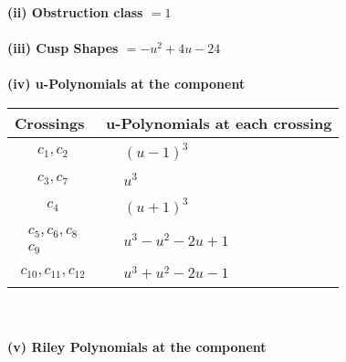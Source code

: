 \documentclass[1p]{elsarticle_modified}
\theoremstyle{definition}
\begin{document}
\flushleft \textbf{(ii) Obstruction class $= 1$}\\~\\
\flushleft \textbf{(iii) Cusp Shapes $= - u^2+4 u-24$}\\~\\
\newpage\renewcommand{\arraystretch}{1}
\flushleft \textbf{(iv) u-Polynomials at the component}\newline \\
\begin{tabular}{m{50pt}|m{274pt}}
Crossings & \hspace{64pt}u-Polynomials at each crossing \\
\hline $$\begin{aligned}c_{1},c_{2}\end{aligned}$$&$\begin{aligned}
&(u-1)^3
\end{aligned}$\\
\hline $$\begin{aligned}c_{3},c_{7}\end{aligned}$$&$\begin{aligned}
&u^3
\end{aligned}$\\
\hline $$\begin{aligned}c_{4}\end{aligned}$$&$\begin{aligned}
&(u+1)^3
\end{aligned}$\\
\hline $$\begin{aligned}c_{5},c_{6},c_{8}\\c_{9}\end{aligned}$$&$\begin{aligned}
&u^3- u^2-2 u+1
\end{aligned}$\\
\hline $$\begin{aligned}c_{10},c_{11},c_{12}\end{aligned}$$&$\begin{aligned}
&u^3+u^2-2 u-1
\end{aligned}$\\
\hline
\end{tabular}\\~\\
\newpage\renewcommand{\arraystretch}{1}
\flushleft \textbf{(v) Riley Polynomials at the component}\newline \\
\end{document}
